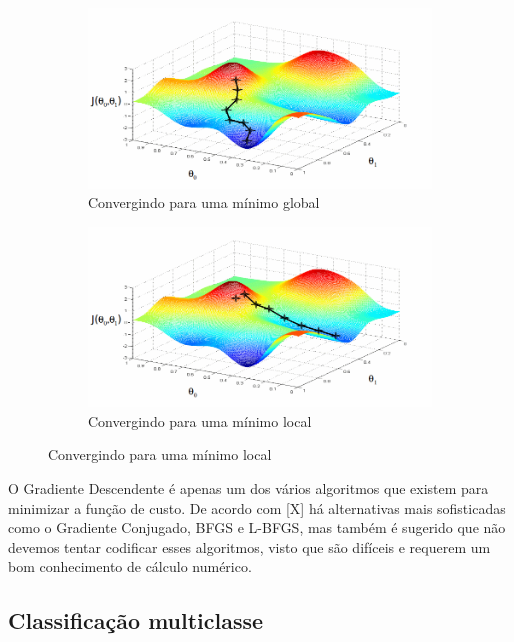\begin{figure}
  \caption{Funcionamento do Gradiente Descendente}
  \begin{subfigure}[htb]{0.5\textwidth}
    \includegraphics[width=\textwidth]{img/funcgraddesc1}
    \caption{Convergindo para uma mínimo global} \label{fig:funcgraddesc}
  \end{subfigure}
  \begin{subfigure}[htb]{0.5\textwidth}
    \includegraphics[width=\textwidth]{img/funcgraddesc2}
    \caption{Convergindo para uma mínimo local} \label{fig:funcgraddescnot}
  \end{subfigure}
\end{figure}

O Gradiente Descendente é apenas um dos vários algoritmos que existem para minimizar a função de custo. De acordo com [X] há alternativas mais sofisticadas como o Gradiente Conjugado, BFGS e L-BFGS, mas também é sugerido que não devemos tentar codificar esses algoritmos, visto que são difíceis e requerem um bom conhecimento de cálculo numérico.


\subsection{Classificação multiclasse}

